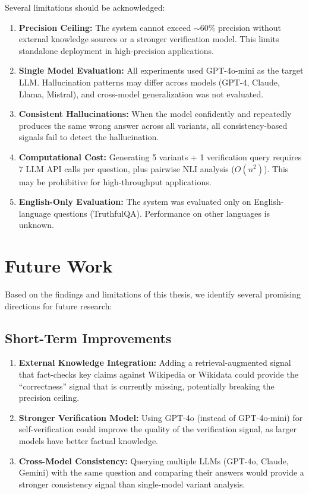 Several limitations should be acknowledged:

\begin{enumerate}
    \item \textbf{Precision Ceiling:} The system cannot exceed $\sim$60\% precision without external knowledge sources or a stronger verification model. This limits standalone deployment in high-precision applications.

    \item \textbf{Single Model Evaluation:} All experiments used GPT-4o-mini as the target LLM. Hallucination patterns may differ across models (GPT-4, Claude, Llama, Mistral), and cross-model generalization was not evaluated.

    \item \textbf{Consistent Hallucinations:} When the model confidently and repeatedly produces the same wrong answer across all variants, all consistency-based signals fail to detect the hallucination.

    \item \textbf{Computational Cost:} Generating 5 variants + 1 verification query requires 7 LLM API calls per question, plus pairwise NLI analysis ($O(n^2)$). This may be prohibitive for high-throughput applications.

    \item \textbf{English-Only Evaluation:} The system was evaluated only on English-language questions (TruthfulQA). Performance on other languages is unknown.
\end{enumerate}

\section{Future Work}

Based on the findings and limitations of this thesis, we identify several promising directions for future research:

\subsection{Short-Term Improvements}

\begin{enumerate}
    \item \textbf{External Knowledge Integration:} Adding a retrieval-augmented signal that fact-checks key claims against Wikipedia or Wikidata could provide the ``correctness'' signal that is currently missing, potentially breaking the precision ceiling.

    \item \textbf{Stronger Verification Model:} Using GPT-4o (instead of GPT-4o-mini) for self-verification could improve the quality of the verification signal, as larger models have better factual knowledge.

    \item \textbf{Cross-Model Consistency:} Querying multiple LLMs (GPT-4o, Claude, Gemini) with the same question and comparing their answers would provide a stronger consistency signal than single-model variant analysis.
\end{enumerate}

